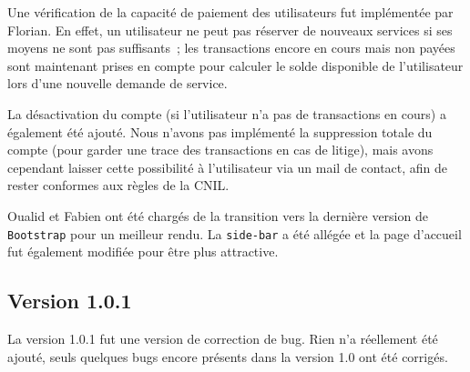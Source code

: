 Une vérification de la capacité de paiement des utilisateurs fut implémentée par Florian. En effet, un utilisateur ne peut pas réserver de nouveaux services si ses moyens ne sont pas suffisants~; les transactions encore en cours mais non payées sont maintenant prises en compte pour calculer le solde disponible de l'utilisateur lors d'une nouvelle demande de service. 

La désactivation du compte (si l'utilisateur n'a pas de transactions en cours) a également été ajouté. Nous n'avons pas implémenté la suppression totale du compte (pour garder une trace des transactions en cas de litige), mais avons cependant laisser cette possibilité à l'utilisateur via un mail de contact, afin de rester conformes aux règles de la CNIL.

Oualid et Fabien ont été chargés de la transition vers la dernière version de \verb|Bootstrap| pour un meilleur rendu. La \verb|side-bar| a été allégée et la page d’accueil fut également modifiée pour être plus attractive.

\subsection{Version 1.0.1}

La version 1.0.1 fut une version de correction de bug. Rien n'a réellement été ajouté, seuls quelques bugs encore présents dans la version 1.0 ont été corrigés.

